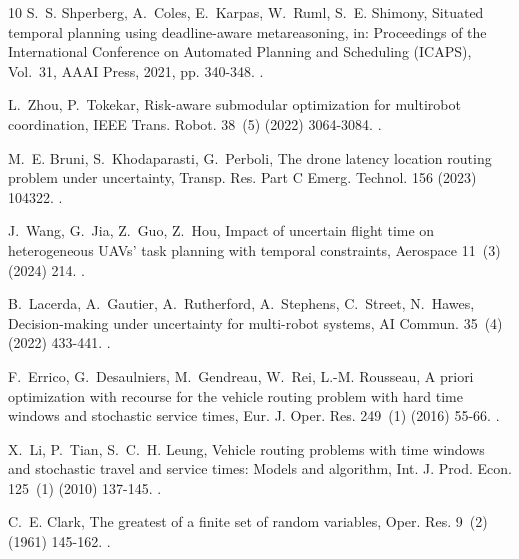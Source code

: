 \documentclass[a4paper,fleqn]{cas-dc}
\begin{document}
\begin{thebibliography}{10}
S.~S. Shperberg, A.~Coles, E.~Karpas, W.~Ruml, S.~E. Shimony, Situated temporal
  planning using deadline-aware metareasoning, in: Proceedings of the
  International Conference on Automated Planning and Scheduling (ICAPS),
  Vol.~31, AAAI Press, 2021, pp. 340-348.
\newblock \href {https://doi.org/10.1609/icaps.v31i1.15979}
  {}.

L.~Zhou, P.~Tokekar, Risk-aware submodular optimization for multirobot
  coordination, IEEE Trans. Robot. 38~(5) (2022) 3064-3084.
\newblock \href {https://doi.org/10.1109/TRO.2022.3158227}
  {}.

M.~E. Bruni, S.~Khodaparasti, G.~Perboli, The drone latency location routing
  problem under uncertainty, Transp. Res. Part C Emerg. Technol. 156 (2023)
  104322.
\newblock \href {https://doi.org/10.1016/j.trc.2023.104322}
  {}.

J.~Wang, G.~Jia, Z.~Guo, Z.~Hou, Impact of uncertain flight time on
  heterogeneous {UAVs}' task planning with temporal constraints, Aerospace
  11~(3) (2024) 214.
\newblock \href {https://doi.org/10.3390/aerospace11030214}
  {}.

B.~Lacerda, A.~Gautier, A.~Rutherford, A.~Stephens, C.~Street, N.~Hawes,
  Decision-making under uncertainty for multi-robot systems, AI Commun. 35~(4)
  (2022) 433-441.
\newblock \href {https://doi.org/10.3233/AIC-220118}
  {}.

F.~Errico, G.~Desaulniers, M.~Gendreau, W.~Rei, L.-M. Rousseau, A priori
  optimization with recourse for the vehicle routing problem with hard time
  windows and stochastic service times, Eur. J. Oper. Res. 249~(1) (2016)
  55-66.
\newblock \href {https://doi.org/10.1016/j.ejor.2015.07.027}
  {}.

X.~Li, P.~Tian, S.~C.~H. Leung, Vehicle routing problems with time windows and
  stochastic travel and service times: Models and algorithm, Int. J. Prod.
  Econ. 125~(1) (2010) 137-145.
\newblock \href {https://doi.org/10.1016/j.ijpe.2010.01.013}
  {}.

C.~E. Clark, The greatest of a finite set of random variables, Oper. Res. 9~(2)
  (1961) 145-162.
\newblock \href {https://doi.org/10.1287/opre.9.2.145}
  {}.


\end{thebibliography}
\end{document}
